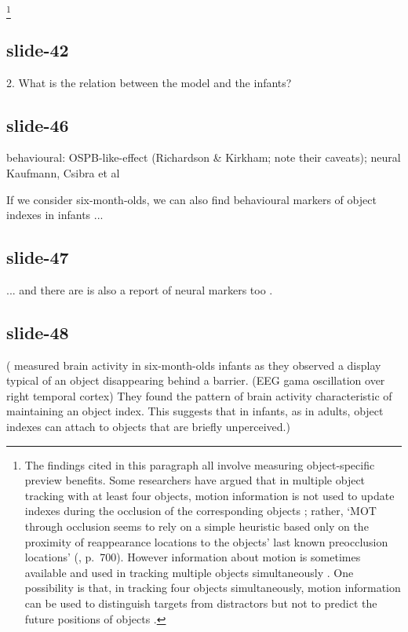 \documentclass[12pt,\papersize]{extarticle}
\begin{document}
\footnote{\label{fn:mot_proximity}
The findings cited in this paragraph all involve measuring object-specific preview benefits.
Some researchers have argued that in multiple object tracking with at least four objects,
motion information is not used to update indexes during the occlusion of the corresponding objects \citep{keane:2006_motion,horowitz:2006_how}; rather, `MOT through occlusion seems to rely on a simple heuristic based only on the proximity of reappearance locations to the objects’ last known preocclusion locations' (\citealp{franconeri:2012_simple}, p.\ 700).
However information about motion is sometimes available \citep{horowitz:2010_direction} and used in tracking multiple objects simultaneously \citep{howe:2012_motion, clair:2012_phd}.
One possibility is that, in tracking four objects simultaneously, motion information can be used to distinguish targets from distractors but not to predict the future positions of objects \citep[p.\ 8]{howe:2012_motion}.
}

\subsection{slide-42}
2. What is the relation between the model and the infants?

\subsection{slide-46}
behavioural: OSPB-like-effect (Richardson \& Kirkham; note their caveats); neural Kaufmann, Csibra
et al

If we consider six-month-olds, we can also find behavioural markers
of object indexes in infants \citep{richardson:2004_multimodal} ...

\subsection{slide-47}
... and there are is also a report of neural markers too \citep{kaufman:2005_oscillatory}.

\subsection{slide-48}
(\citet{kaufman:2005_oscillatory} measured brain activity in
six-month-olds infants as they observed a display typical of an object
disappearing behind a barrier.
(EEG gama oscillation over right temporal cortex)
They found the pattern of brain activity characteristic of maintaining
an object index.
This suggests that in infants, as in adults, object indexes can attach
to objects that are briefly unperceived.)
\end{document}
